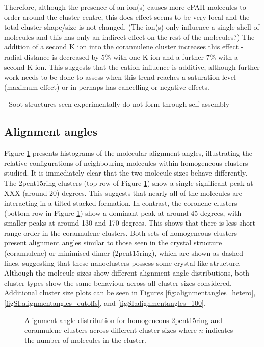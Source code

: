 Therefore, although the presence of an ion(s) causes more cPAH molecules to order around the cluster centre, this does effect seems to be very local and the total cluster shape/size is not changed.  (The ion(s) only influence a single shell of molecules and this has only an indirect effect on the rest of the molecules?)
The addition of a second K ion into the corannulene cluster increases this effect - radial distance is decreased by 5\% with one K ion and a further 7\% with a second K ion. This suggests that the cation influence is additive, although further work needs to be done to assess when this trend reaches a saturation level (maximum effect) or in perhaps has cancelling or negative effects.

- Soot structures seen experimentally do not form through self-assembly


\subsection{Alignment angles}

Figure \ref{fig:alignmentangles_homo} presents histograms of the molecular alignment angles, illustrating the relative configurations of neighbouring molecules within homogeneous clusters studied.
It is immediately clear that the two molecule sizes behave differently. The 2pent15ring clusters (top row of Figure \ref{fig:alignmentangles_homo}) show a single significant peak at XXX (around 20) degrees.  This suggests that nearly all of the molecules are interacting in a tilted stacked formation. In contrast, the coronene clusters (bottom row in Figure \ref{fig:alignmentangles_homo}) show a dominant peak at around 45 degrees, with smaller peaks at around 130 and 170 degrees. This shows that there is less short-range order in the corannulene clusters. Both sets of homogeneous clusters present alignment angles similar to those seen in the crystal structure (corannulene) or minimised dimer (2pent15ring), which are shown as dashed lines, suggesting that these nanoclusters possess some crystal-like structure.  Although the molecule sizes show different alignment angle distributions, both cluster types show the same behaviour across all cluster sizes considered. Additional cluster size plots can be seen in Figures \ref{fig:alignmentangles_hetero}, \ref{figSI:alignmentangles_cutoffs}, and \ref{figSI:alignmentangles_100}.
%
\begin{figure}[!tbh]
\centering
\caption{Alignment angle distribution for homogeneous 2pent15ring and corannulene clusters across different cluster sizes where $n$ indicates the number of molecules in the cluster.}
\label{fig:alignmentangles_homo}
\end{figure}
%

